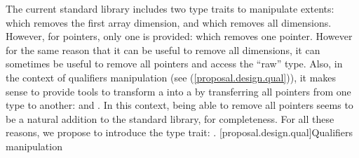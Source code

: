 \documentclass[ebook,10pt,oneside,openany,final]{memoir}
\begin{document}
The current standard library includes two type traits to manipulate extents:  which removes the first array dimension, and  which removes all dimensions. However, for pointers, only one is provided:  which removes one pointer. However for the same reason that it can be useful to remove all dimensions, it can sometimes be useful to remove all pointers and access the ``raw'' type. Also, in the context of qualifiers manipulation (see (\ref{proposal.design.qual})), it makes sense to provide tools to transform a  into a  by transferring all pointers from one type to another:  and . In this context, being able to remove all pointers seems to be a natural addition to the standard library, for completeness. For all these reasons, we propose to introduce the type trait: .
[proposal.design.qual]{Qualifiers manipulation}
\end{document}
